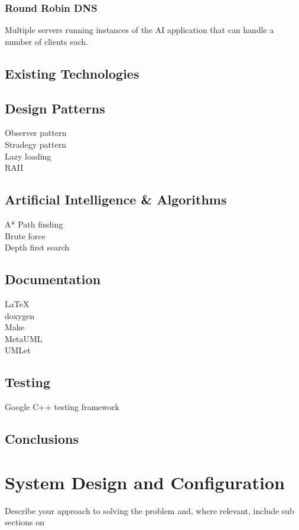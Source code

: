 \documentclass[12pt,a4paper,titlepage]{article}
\begin{document}
\subsubsection{Round Robin DNS}

Multiple servers running instances of the AI application that can handle a number of clients each. 

\subsection{Existing Technologies}

\subsection{Design Patterns}
Observer pattern\\
Stradegy pattern\\
Lazy loading\\
RAII\\

\subsection{Artificial Intelligence \& Algorithms}
A* Path finding\\
Brute force\\
Depth first search\\

\subsection{Documentation}
LaTeX\\
doxygen\\
Make\\
MetaUML\\
UMLet\\

\subsection{Testing}
Google C++ testing framework

\subsection{Conclusions}

\section{System Design and Configuration}
Describe your approach to solving the problem and, where relevant, include sub sections on
\end{document}
